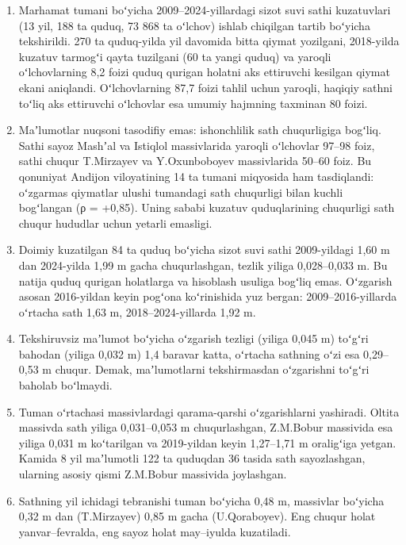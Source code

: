 \begin{enumerate}
\def\labelenumi{\arabic{enumi}.}
\tightlist
\item
  Marhamat tumani boʻyicha 2009--2024-yillardagi sizot suvi sathi
  kuzatuvlari (13 yil, 188 ta quduq, 73 868 ta oʻlchov) ishlab chiqilgan
  tartib boʻyicha tekshirildi. 270 ta quduq-yilda yil davomida bitta
  qiymat yozilgani, 2018-yilda kuzatuv tarmogʻi qayta tuzilgani (60 ta
  yangi quduq) va yaroqli oʻlchovlarning 8,2 foizi quduq qurigan holatni
  aks ettiruvchi kesilgan qiymat ekani aniqlandi. Oʻlchovlarning 87,7
  foizi tahlil uchun yaroqli, haqiqiy sathni toʻliq aks ettiruvchi
  oʻlchovlar esa umumiy hajmning taxminan 80 foizi.
\item
  Maʼlumotlar nuqsoni tasodifiy emas: ishonchlilik sath chuqurligiga
  bogʻliq. Sathi sayoz Mashʼal va Istiqlol massivlarida yaroqli
  oʻlchovlar 97--98 foiz, sathi chuqur T.Mirzayev va Y.Oxunboboyev
  massivlarida 50--60 foiz. Bu qonuniyat Andijon viloyatining 14 ta
  tumani miqyosida ham tasdiqlandi: oʻzgarmas qiymatlar ulushi tumandagi
  sath chuqurligi bilan kuchli bogʻlangan (ρ = +0,85). Uning sababi
  kuzatuv quduqlarining chuqurligi sath chuqur hududlar uchun yetarli
  emasligi.
\item
  Doimiy kuzatilgan 84 ta quduq boʻyicha sizot suvi sathi 2009-yildagi
  1,60 m dan 2024-yilda 1,99 m gacha chuqurlashgan, tezlik yiliga
  0,028--0,033 m. Bu natija quduq qurigan holatlarga va hisoblash
  usuliga bogʻliq emas. Oʻzgarish asosan 2016-yildan keyin pogʻona
  koʻrinishida yuz bergan: 2009--2016-yillarda oʻrtacha sath 1,63 m,
  2018--2024-yillarda 1,92 m.
\item
  Tekshiruvsiz maʼlumot boʻyicha oʻzgarish tezligi (yiliga 0,045 m)
  toʻgʻri bahodan (yiliga 0,032 m) 1,4 baravar katta, oʻrtacha sathning
  oʻzi esa 0,29--0,53 m chuqur. Demak, maʼlumotlarni tekshirmasdan
  oʻzgarishni toʻgʻri baholab boʻlmaydi.
\item
  Tuman oʻrtachasi massivlardagi qarama-qarshi oʻzgarishlarni yashiradi.
  Oltita massivda sath yiliga 0,031--0,053 m chuqurlashgan, Z.M.Bobur
  massivida esa yiliga 0,031 m koʻtarilgan va 2019-yildan keyin
  1,27--1,71 m oraligʻiga yetgan. Kamida 8 yil maʼlumotli 122 ta
  quduqdan 36 tasida sath sayozlashgan, ularning asosiy qismi Z.M.Bobur
  massivida joylashgan.
\item
  Sathning yil ichidagi tebranishi tuman boʻyicha 0,48 m, massivlar
  boʻyicha 0,32 m dan (T.Mirzayev) 0,85 m gacha (U.Qoraboyev). Eng
  chuqur holat yanvar--fevralda, eng sayoz holat may--iyulda kuzatiladi.

\end{enumerate}
